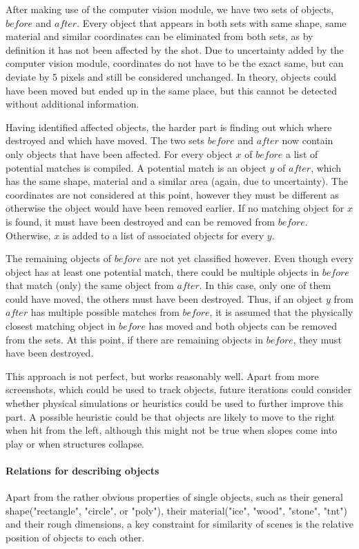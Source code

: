 After making use of the computer vision module, we have two sets of objects, $before$ and $after$. Every object that appears in both sets with same shape, same material and similar coordinates can be eliminated  from both sets, as by definition it has not been affected by the shot. Due to uncertainty added by the computer vision module, coordinates do not have to be the exact same, but can deviate by 5 pixels and still be considered unchanged. In theory, objects could have been moved but ended up in the same place, but this cannot be detected without additional information.

Having identified affected objects, the harder part is finding out which where destroyed and which have moved. The two sets $before$ and $after$ now contain only objects that have been affected.
For every object $x$ of $before$ a list of potential matches is compiled. A potential match is an object $y$ of $after$, which has the same shape, material and a similar area (again, due to uncertainty). The coordinates are not considered at this point, however they must be different as otherwise the object would have been removed earlier.
If no matching object for $x$ is found, it must have been destroyed and can be removed from $before$. Otherwise, $x$ is added to a list of associated objects for every $y$.

The remaining objects of $before$ are not yet classified however. Even though every object has at least one potential match, there could be multiple objects in $before$ that match (only) the same object from $after$. In this case, only one of them could have moved, the others must have been destroyed. Thus, if an object $y$ from $after$ has multiple possible matches from $before$, it is assumed that the physically closest matching object in $before$ has moved and both objects can be removed from the sets. At this point, if there are remaining objects in $before$, they must have been destroyed.

This approach is not perfect, but works reasonably well. Apart from more screenshots, which could be used to track objects, future iterations could consider whether physical simulations or heuristics could be used to further improve this part. A possible heuristic could be that objects are likely to move to the right when hit from the left, although this might not be true when slopes come into play or when structures collapse.


\paragraph{Relations for describing objects}
Apart from the rather obvious properties of single objects, such as their general shape("rectangle", "circle", or "poly"), their material("ice", "wood", "stone", "tnt") and their rough dimensions, a key constraint for similarity of scenes is the relative position of objects to each other.


